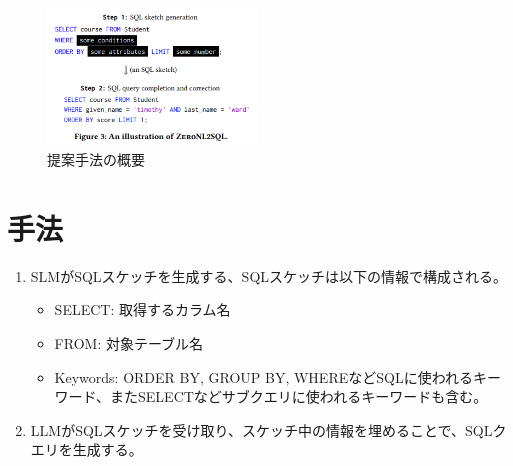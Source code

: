 \documentclass[dvipdfmx,uplatex]{jsarticle}
\theoremstyle{remark}
\newenvironment{method}[1]{
    \begin{tcolorbox}[
        colframe=green!50!black,
        colback=green!50!black!10!white,
        colbacktitle=green!50!black!40!white,
        coltitle=black,
        fonttitle=\bfseries,
        title={#1}
    ]
}{
    \end{tcolorbox}
}
\begin{document}
\begin{figure}
    \centering
    \includegraphics[width=0.5\textwidth]{img/text2sql-with-slm-and-llm/overview.png}
    \caption{提案手法の概要}
    \label{fig:overview}
\end{figure}

\section{手法}
\begin{method}{Overview}
\begin{enumerate}
    \item SLMがSQLスケッチを生成する、SQLスケッチは以下の情報で構成される。
    \begin{itemize}
        \item SELECT: 取得するカラム名
        \item FROM: 対象テーブル名
        \item Keywords: ORDER BY, GROUP BY, WHEREなどSQLに使われるキーワード、またSELECTなどサブクエリに使われるキーワードも含む。
    \end{itemize}
    \item LLMがSQLスケッチを受け取り、スケッチ中の情報を埋めることで、SQLクエリを生成する。
\end{enumerate}
\end{method}
\end{document}
